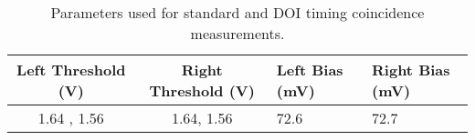 \begin{table}
\caption{\label{tab:optimumparam} Parameters used for standard and DOI timing coincidence measurements.} 
\begin{tabular}{ccll}
\hline
Left Threshold (V) & Right Threshold (V) & Left Bias (mV) & Right Bias (mV)\\
\hline
1.64 , 1.56 &  1.64, 1.56 &  72.6 &  72.7\\
\hline
\end{tabular}
\end{table}
